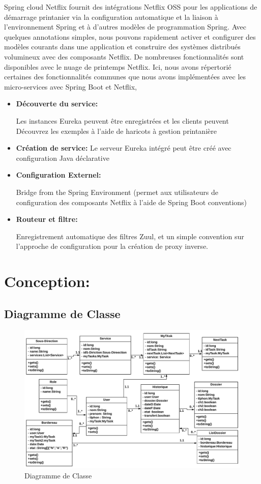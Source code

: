 Spring cloud Netflix fournit des intégrations Netflix OSS pour les applications de démarrage printanier via la configuration automatique et la liaison à l'environnement Spring et à d'autres modèles de programmation Spring. Avec quelques annotations simples, nous pouvons rapidement activer et configurer des modèles courants dans une application et construire des systèmes distribués volumineux avec des composants Netflix. De nombreuses fonctionnalités sont disponibles avec le nuage de printemps Netflix. Ici, nous avons répertorié certaines des fonctionnalités communes que nous avons implémentées avec les micro-services avec Spring Boot et Netflix,

\begin{itemize}
\item \textbf{Découverte du service:}
	
	Les instances Eureka peuvent être enregistrées et les clients peuvent
	Découvrez les exemples à l'aide de haricots à gestion printanière
	

\item \textbf{	Création de service:}	
	Le serveur Eureka intégré peut être créé avec
	configuration Java déclarative
	
\item \textbf{	Configuration Externel:}	
	
	Bridge from the Spring Environment (permet aux utilisateurs de
	configuration des composants Netflix à l'aide de Spring Boot
	conventions)
	
      \item \textbf{	Routeur et filtre:}	
	
	Enregistrement automatique des filtres Zuul, et un simple
	convention sur l'approche de configuration pour la création de proxy inverse.
\end{itemize}
 
 \section{Conception:}
 \subsection{Diagramme de Classe}
 \begin{figure}[H]
 	\centering
 	\includegraphics[width=1\linewidth]{images/class3}
 	\caption{Diagramme de Classe}
 	\label{fig:class}
 \end{figure}
   